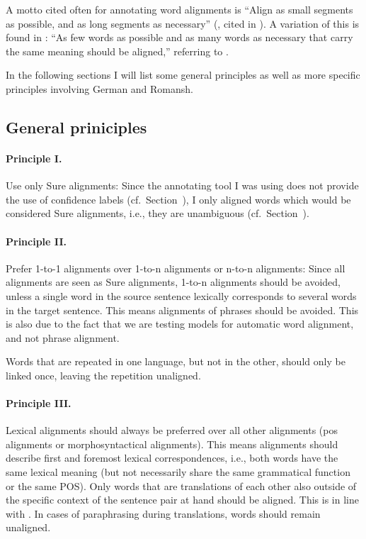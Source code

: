 A motto cited often for annotating word alignments is \enquote{Align as small segments as possible, and as long segments as necessary} (\cite{Vronis00evaluationof}, cited in \cite{lines2007}). A variation of this is found in \cite{clematide2018}: \enquote{As few words as possible and as many words as necessary that carry the same meaning should be aligned,} referring to \cite{lambert2005}. 

In the following sections I will list some general principles as well as more specific principles involving German and Romansh.

\subsection{General priniciples}
\label{sec:gold-principles}
\paragraph{Principle I.} 
Use only Sure alignments: 
Since the annotating tool I was using does not provide the use of confidence labels (cf.~Section~), I only aligned words which would be considered Sure alignments, i.e., they are unambiguous (cf.~Section~). 


\paragraph{Principle II.}
Prefer 1-to-1 alignments over 1-to-n alignments or n-to-n alignments: 
Since all alignments are seen as Sure alignments, 1-to-n alignments should be avoided, unless a single word in the source sentence lexically corresponds to several words in the target sentence. %
This means alignments of phrases should be avoided. This is also due to the fact that we are testing models for automatic word alignment, and not phrase alignment.




Words that are repeated in one language, but not in the other, should only be linked once, leaving the repetition unaligned.

\paragraph{Principle III.}
Lexical alignments should always be preferred over all other alignments (\acrfull{pos} alignments or morphosyntactical alignments). 
This means alignments should describe first and foremost lexical correspondences, i.e., both words have the same lexical meaning (but not necessarily share the same grammatical function or the same POS).
Only words that are translations of each other also outside of the specific context of the sentence pair at hand should be aligned. This is in line with \cite{clematide2018}.
In cases of paraphrasing during translations, words should remain unaligned. %


